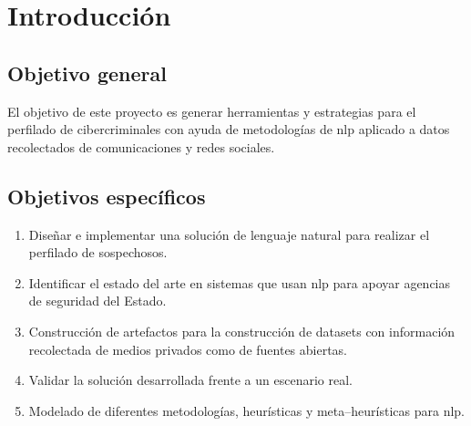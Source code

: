 \chapter{Introducción} %

\label{chIntroduction} %


\section{Objetivo general}
El objetivo de este proyecto es generar herramientas y estrategias para el perfilado de cibercriminales con ayuda de metodologías de \gls{nlp} aplicado a datos recolectados de comunicaciones y redes sociales.

\section{Objetivos específicos}
\begin{enumerate}
  
\item Diseñar e implementar una solución de lenguaje natural para realizar el perfilado de sospechosos.

\item Identificar el estado del arte en sistemas que usan \gls{nlp} para apoyar agencias de seguridad del Estado.

\item Construcción de artefactos para la construcción de \gls{dataset}s con información recolectada de medios privados como de fuentes abiertas.

\item Validar la solución desarrollada frente a un escenario real.

\item Modelado de diferentes metodologías, heurísticas y meta--heurísticas para \gls{nlp}.

\end{enumerate}
